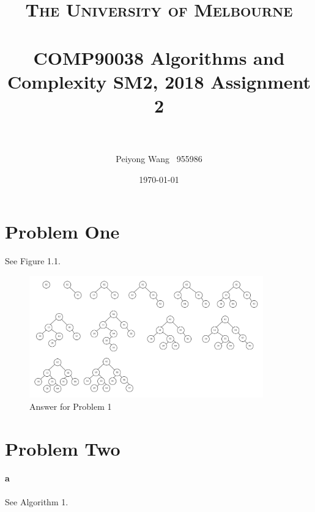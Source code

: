 \documentclass[paper=a4, fontsize=11pt]{scrartcl} %
\title{	
\normalfont \normalsize 
\textsc{The University of Melbourne } \\ [25pt] %
\horrule{0.5pt} \\[0.4cm] %
\huge COMP90038  Algorithms and Complexity SM2, 2018
Assignment 2 \\ %
\horrule{2pt} \\[0.5cm] %
}
\author{Peiyong Wang $\,$ 955986 } %
\date{\normalsize\today} %
\numberwithin{equation}{section} %
\numberwithin{figure}{section} %
\numberwithin{table}{section} %
\begin{document}
\maketitle %
\thispagestyle{empty}%


\section{Problem One}
See Figure 1.1.

\begin{figure}[htbp!]
		\centering
		\includegraphics[width=0.9\textwidth]{f1.png}
		\caption{Answer for Problem 1}%
		\vspace{-1em}
\end{figure}


\section{Problem Two}
\paragraph{a}

See Algorithm 1.
\end{document}
